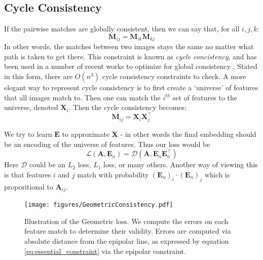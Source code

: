 \documentclass[10pt,twocolumn,letterpaper]{article}
\newcommand{\mat}[1]{\mathbf{#1}}
\begin{document}
\subsection{Cycle Consistency}
If the pairwise matches are globally consistent, then we can say that, for all $i, j, k$:
\begin{equation}
\mat{M}_{ij} = \mat{M}_{ik} \mat{M}_{kj}
\label{eq:cycconsist1}
\end{equation}
In other words, the matches between two images stays the same no matter what path is taken to get there. 
This constraint is known as \textit{cycle concistency}, and has been used in a number of recent works to optimize for global consistency \cite{zhou2015multi, wang2017multi, leonardos2016distributed}.
Stated in this form, there are $O(n^3)$ cycle consistency constraints to check.
A more elegant way to represent cycle consistency is to first create a `universe' of features that all images match to.
Then one can match the $i^{th}$ set of features to the universe, denoted $\mat{X}_i$.
Then the cycle consistency becomes:
\begin{equation}
\mat{M}_{ij} = \mat{X}_{i}\mat{X}_{j}^\top
\label{eq:cycconsist2}
\end{equation}

We try to learn $\mat{E}$ to approximate $\mat{X}$ - in other words the final embedding should be an encoding of the universe of features.
Thus our loss would be 
\begin{equation}
\mathcal{L}(\mat{A}, \mat{E}_n) = \mathcal{D}(\mat{A}, \mat{E}_n\mat{E}_n^\top)
\end{equation}
Here $\mathcal{D}$ could be an $L_2$ loss, $L_1$ loss, or many others. 
Another way of viewing this is that features $i$ and $j$ match with probability $(\mat{E}_n)_i \cdot (\mat{E}_n)_j$ which is proporitional to $\mat{A}_{ij}$.

\begin{figure}[t]
\begin{center}
  \texttt{[image: figures/GeometricConsistency.pdf]}
\end{center}
  \caption{
    Illustration of the Geometric loss.
    We compute the errors on each feature match to determine their validity.
    Errors are computed via absolute distance from the epipolar line, as expressed by equation \ref{eq:essential_constraint} via the epipolar constraint.
  }
\label{fig:cycconsistex}
\label{fig:onecol}
\end{figure}
\end{document}

